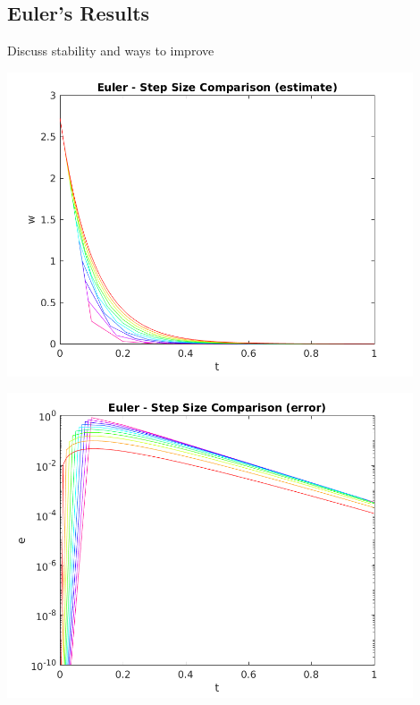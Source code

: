 \documentclass{article}
\begin{document}





\subsection{Euler's Results}
\label{results:euler}

Discuss stability and ways to improve

\begin{center}
  \includegraphics[width=0.9\textwidth]{../output/a_euler_h_val.png}
  \label{fig:a_euler_h_val}
\end{center}

\begin{center}
  \includegraphics[width=0.9\textwidth]{../output/a_euler_h_err.png}
  \label{fig:a_euler_h_err}
\end{center}
\end{document}
